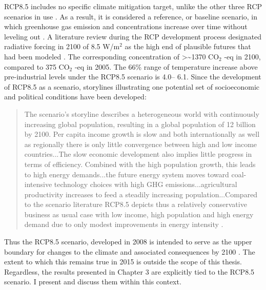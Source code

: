 RCP8.5 includes no specific climate mitigation target, unlike the other three RCP scenarios in use \citep{Riahi2011}. As a result, it is considered a reference, or baseline scenario, in which greenhouse gas emission and concentrations increase over time without leveling out \citep{Riahi2011}. A literature review during the RCP development process designated radiative forcing in 2100 of 8.5 W/m$^2$ as the high end of plausible futures that had been modeled \citep{VanVuuren2011}. The corresponding concentration of >\textasciitilde 1370 $\text{CO}_2$ -eq in 2100, compared to 375 $\text{CO}_2$ -eq in 2005. The 66\% range of temperature increase above pre-industrial levels under the RCP8.5 scenario is 4.0\textdegree -- 6.1\textdegree \citep{Rogelj2012}. Since the development of RCP8.5 as a scenario, storylines illustrating one potential set of socioeconomic and political conditions have been developed:
%
\begin{quote} 
The scenario’s storyline describes a heterogeneous world with continuously increasing global population, resulting in a global population of 12 billion by 2100. Per capita income growth is slow and both internationally as well as regionally there is only little convergence between high and low income countries...The slow economic development also implies little progress in terms of efficiency. Combined with the high population growth, this leads to high energy demands...the future energy system moves toward coal-intensive technology choices with high GHG emissions...agricultural productivity increases to feed a steadily increasing population...Compared to the scenario literature RCP8.5 depicts thus a relatively conservative business as usual case with low income, high population and high energy demand due to only modest improvements in energy intensity \citep{Riahi2011}.
\end{quote}
%
Thus the RCP8.5 scenario, developed in 2008 is intended to serve as the upper boundary for changes to the climate and associated consequences by 2100 \citep{Moss2008}. The extent to which this remains true in 2015 is outside the scope of this thesis. Regardless, the results presented in Chapter 3 are explicitly tied to the RCP8.5 scenario. I present and discuss them within this context.


